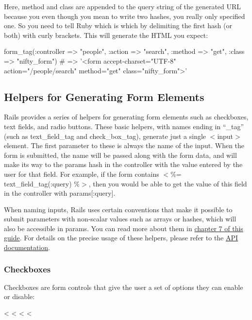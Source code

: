 \documentclass[10pt]{book}
\newenvironment{code}{%
  \scriptsize
    \verbatim
}{%
    \endverbatim
    \newline
}
\begin{document}
Here, method and class are appended to the query string of the generated URL  because you even though you mean to write two hashes, you really only  specified one. So you need to tell Ruby which is which by delimiting the  first hash (or both) with curly brackets. This will generate the HTML you expect:
\begin{code}
form_tag({:controller => "people", :action => "search"},
          :method => "get", :class => "nifty_form")
# => '<form accept-charset="UTF-8" action="/people/search"
            method="get" class="nifty_form">'
\end{code}

\subsection{ Helpers for Generating Form Elements}

Rails provides a series of helpers for generating form elements such  as checkboxes, text fields, and radio buttons. These basic helpers, with  names ending in “\_tag” (such as text\_field\_tag and check\_box\_tag), generate just a single $<$input$>$  element. The first parameter to these is always the name of the input.  When the form is submitted, the name will be passed along with the form  data, and will make its way to the params hash in the controller with the value entered by the user for that field. For example, if the form contains $<$\%= text\_field\_tag(:query) \%$>$, then you would be able to get the value of this field in the controller with params[:query].

When naming inputs, Rails uses certain conventions that make it  possible to submit parameters with non-scalar values such as arrays or  hashes, which will also be accessible in params. You can read more about them in \hyperlink{understanding-parameter-naming-conventions}{chapter 7 of this guide}. For details on the precise usage of these helpers, please refer to the \href{http://api.rubyonrails.org/classes/ActionView/Helpers/FormTagHelper.html}{API documentation}.

\subsubsection{ Checkboxes}

Checkboxes are form controls that give the user a set of options they can enable or disable:
\begin{code}
<%
<%
<%
<%
\end{code}
\end{document}

